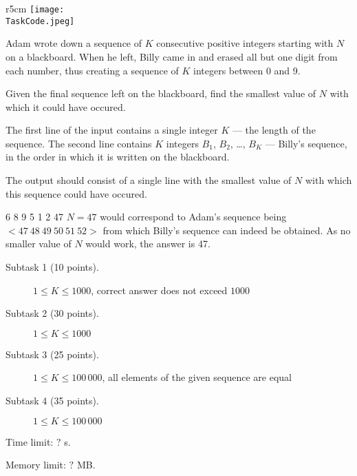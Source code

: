 \documentclass{boi2014}
\renewcommand{\TaskCode}{sequence}
\begin{document}
    \begin{wrapfigure}[5]{r}{5cm}
        \vspace{-24pt}
		\texttt{[image: \\TaskCode.jpeg]}
	\end{wrapfigure}

    Adam wrote down a sequence of $K$ consecutive positive integers starting
    with $N$ on a blackboard. When he left, Billy came in and erased all but one
    digit from each number, thus creating a sequence of $K$ integers between 0
    and 9.

    \Task

    Given the final sequence left on the blackboard, find the smallest
    value of $N$ with which it could have occured.

    \Input

    The first line of the input contains a single integer $K$ --- the length of
    the sequence. The second line contains $K$ integers $B_1$, $B_2$, \dots,
    $B_K$ --- Billy's sequence, in the order in which it is written on the
    blackboard.

    \Output

    The output should consist of a single line with the smallest value of
    $N$ with which this sequence could have occured.

    \Example

    \example
    {
        6 8 9 5 1 2
    }
    {
        47
    }
    {
        $N = 47$ would correspond to Adam's sequence
        being $<47\ 48\ 49\ 50\ 51\ 52>$ from which Billy's sequence
        can indeed be obtained. As no smaller value of $N$
        would work, the answer is 47.
    }

\Scoring

\begin{description}
    \item[Subtask 1 (10 points).] $1 \le K \le 1000$, correct
        answer does not exceed $1000$
    \item[Subtask 2 (30 points).] $1 \le K \le 1000$
    \item[Subtask 3 (25 points).] $1 \le K \le 100\,000$, all
		elements of the given sequence are equal
    \item[Subtask 4 (35 points).] $1 \le K \le 100\,000$
\end{description}

\Constraints

Time limit: $?$ s.

Memory limit: $?$ MB.
\end{document}
